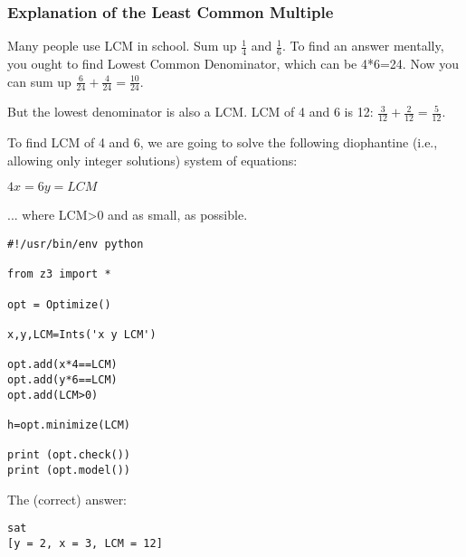 \subsubsection{Explanation of the Least Common Multiple}

Many people use \ac{LCM} in school. Sum up $\frac{1}{4}$ and $\frac{1}{6}$.
To find an answer mentally, you ought to find Lowest Common Denominator, which can be 4*6=24.
Now you can sum up $\frac{6}{24} + \frac{4}{24} = \frac{10}{24}$.

But the lowest denominator is also a LCM.
LCM of 4 and 6 is 12: $\frac{3}{12} + \frac{2}{12} = \frac{5}{12}$.

To find LCM of 4 and 6, we are going to solve the following diophantine (i.e., allowing only integer solutions) system of equations:

$4x = 6y = LCM$

... where LCM>0 and as small, as possible.

\begin{lstlisting}
#!/usr/bin/env python

from z3 import *

opt = Optimize()

x,y,LCM=Ints('x y LCM')

opt.add(x*4==LCM)
opt.add(y*6==LCM)
opt.add(LCM>0)

h=opt.minimize(LCM)

print (opt.check())
print (opt.model())
\end{lstlisting}

The (correct) answer:

\begin{lstlisting}
sat
[y = 2, x = 3, LCM = 12]
\end{lstlisting}

